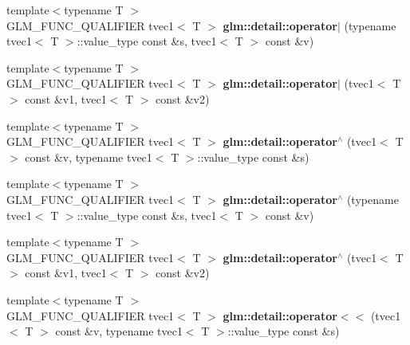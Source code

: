 \begin{DoxyCompactItemize}
\item 
\hypertarget{namespaceglm_1_1detail_a67eb55f8dc726ed768270c88e38415c4}{{\footnotesize template$<$typename T $>$ }\\G\-L\-M\-\_\-\-F\-U\-N\-C\-\_\-\-Q\-U\-A\-L\-I\-F\-I\-E\-R tvec1$<$ T $>$ {\bfseries glm\-::detail\-::operator$\vert$} (typename tvec1$<$ T $>$\-::value\-\_\-type const \&s, tvec1$<$ T $>$ const \&v)}\label{namespaceglm_1_1detail_a67eb55f8dc726ed768270c88e38415c4}

\item 
\hypertarget{namespaceglm_1_1detail_a83797a3d1074a697423d0dd416b8a6d1}{{\footnotesize template$<$typename T $>$ }\\G\-L\-M\-\_\-\-F\-U\-N\-C\-\_\-\-Q\-U\-A\-L\-I\-F\-I\-E\-R tvec1$<$ T $>$ {\bfseries glm\-::detail\-::operator$\vert$} (tvec1$<$ T $>$ const \&v1, tvec1$<$ T $>$ const \&v2)}\label{namespaceglm_1_1detail_a83797a3d1074a697423d0dd416b8a6d1}

\item 
\hypertarget{namespaceglm_1_1detail_a3e9ecd067dd9b3fc5ea95bf53777a1f0}{{\footnotesize template$<$typename T $>$ }\\G\-L\-M\-\_\-\-F\-U\-N\-C\-\_\-\-Q\-U\-A\-L\-I\-F\-I\-E\-R tvec1$<$ T $>$ {\bfseries glm\-::detail\-::operator$^\wedge$} (tvec1$<$ T $>$ const \&v, typename tvec1$<$ T $>$\-::value\-\_\-type const \&s)}\label{namespaceglm_1_1detail_a3e9ecd067dd9b3fc5ea95bf53777a1f0}

\item 
\hypertarget{namespaceglm_1_1detail_a38abb9ca72295b5e102516ad4ff2d568}{{\footnotesize template$<$typename T $>$ }\\G\-L\-M\-\_\-\-F\-U\-N\-C\-\_\-\-Q\-U\-A\-L\-I\-F\-I\-E\-R tvec1$<$ T $>$ {\bfseries glm\-::detail\-::operator$^\wedge$} (typename tvec1$<$ T $>$\-::value\-\_\-type const \&s, tvec1$<$ T $>$ const \&v)}\label{namespaceglm_1_1detail_a38abb9ca72295b5e102516ad4ff2d568}

\item 
\hypertarget{namespaceglm_1_1detail_a08d05d54da1a8f9cd0c1dfc620d24540}{{\footnotesize template$<$typename T $>$ }\\G\-L\-M\-\_\-\-F\-U\-N\-C\-\_\-\-Q\-U\-A\-L\-I\-F\-I\-E\-R tvec1$<$ T $>$ {\bfseries glm\-::detail\-::operator$^\wedge$} (tvec1$<$ T $>$ const \&v1, tvec1$<$ T $>$ const \&v2)}\label{namespaceglm_1_1detail_a08d05d54da1a8f9cd0c1dfc620d24540}

\item 
\hypertarget{namespaceglm_1_1detail_a1b2401f17739acc84c535021545748b5}{{\footnotesize template$<$typename T $>$ }\\G\-L\-M\-\_\-\-F\-U\-N\-C\-\_\-\-Q\-U\-A\-L\-I\-F\-I\-E\-R tvec1$<$ T $>$ {\bfseries glm\-::detail\-::operator$<$$<$} (tvec1$<$ T $>$ const \&v, typename tvec1$<$ T $>$\-::value\-\_\-type const \&s)}\label{namespaceglm_1_1detail_a1b2401f17739acc84c535021545748b5}


\end{DoxyCompactItemize}
